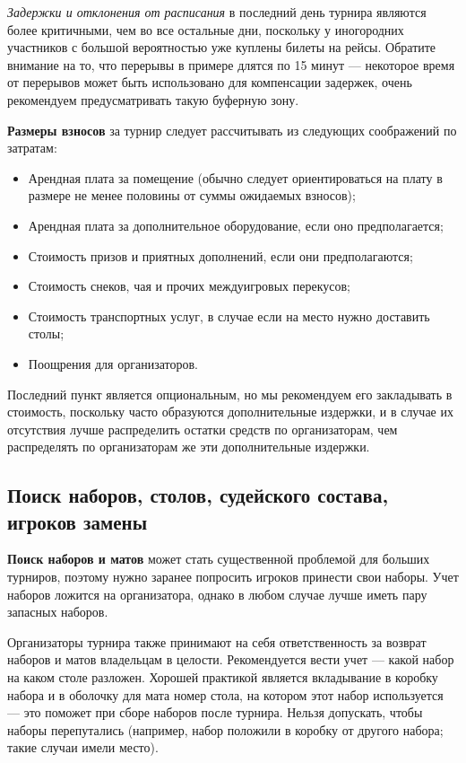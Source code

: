 \textit{Задержки и отклонения от расписания} в последний день турнира являются более критичными, чем во все остальные дни, поскольку у иногородних участников с большой вероятностью уже куплены билеты на рейсы. Обратите внимание на то, что перерывы в примере длятся по 15 минут --- некоторое время от перерывов может быть использовано для компенсации задержек, очень рекомендуем предусматривать такую буферную зону.

\textbf{Размеры взносов} за турнир следует рассчитывать из следующих соображений по затратам:
\begin{itemize}
	\item Арендная плата за помещение (обычно следует ориентироваться на плату в размере не менее половины от суммы ожидаемых взносов);
	\item Арендная плата за дополнительное оборудование, если оно предполагается;
	\item Стоимость призов и приятных дополнений, если они предполагаются;
	\item Стоимость снеков, чая и прочих междуигровых перекусов;
	\item Стоимость транспортных услуг, в случае если на место нужно доставить столы;
	\item Поощрения для организаторов.
\end{itemize}

Последний пункт является опциональным, но мы рекомендуем его закладывать в стоимость, поскольку часто образуются дополнительные издержки, и в случае их отсутствия лучше распределить остатки средств по организаторам, чем распределять по организаторам же эти дополнительные издержки.

\subsection{Поиск наборов, столов, судейского состава, игроков замены}

\textbf{Поиск наборов и матов} может стать существенной проблемой для больших турниров, поэтому нужно заранее попросить игроков принести свои наборы. Учет наборов ложится на организатора, однако в любом случае лучше иметь пару запасных наборов.

Организаторы турнира также принимают на себя ответственность за возврат наборов и матов владельцам в целости. Рекомендуется вести учет --- какой набор на каком столе разложен. Хорошей практикой является вкладывание в коробку набора и в оболочку для мата номер стола, на котором этот набор используется --- это поможет при сборе наборов после турнира. Нельзя допускать, чтобы наборы перепутались (например, набор положили в коробку от другого набора; такие случаи имели место).

